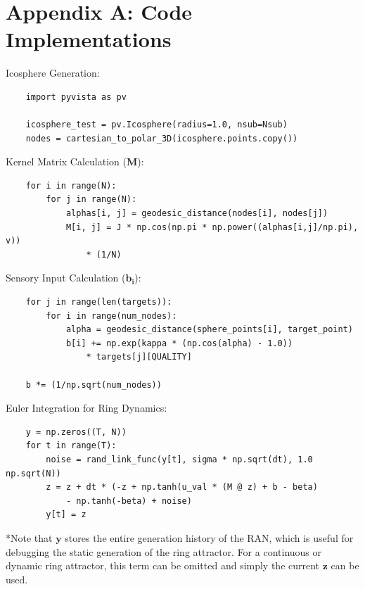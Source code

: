 \documentclass[12pt, letterpaper]{article}
\begin{document}
\section{Appendix A: Code Implementations}
\label{AppendixA}
Icosphere Generation: 
\begin{verbatim}
    import pyvista as pv
    
    icosphere_test = pv.Icosphere(radius=1.0, nsub=Nsub)
    nodes = cartesian_to_polar_3D(icosphere.points.copy())
\end{verbatim}

Kernel Matrix Calculation ($\mathbf{M}$): 
\begin{verbatim}
    for i in range(N):
        for j in range(N):           
            alphas[i, j] = geodesic_distance(nodes[i], nodes[j])
            M[i, j] = J * np.cos(np.pi * np.power((alphas[i,j]/np.pi), v)) 
                * (1/N)
\end{verbatim}


Sensory Input Calculation ($\mathbf{b_i}$):
\begin{verbatim}
    for j in range(len(targets)):
        for i in range(num_nodes):
            alpha = geodesic_distance(sphere_points[i], target_point)
            b[i] += np.exp(kappa * (np.cos(alpha) - 1.0)) 
                * targets[j][QUALITY]
    
    b *= (1/np.sqrt(num_nodes)) 
\end{verbatim}

Euler Integration for Ring Dynamics:
\begin{verbatim}
    y = np.zeros((T, N))
    for t in range(T):
        noise = rand_link_func(y[t], sigma * np.sqrt(dt), 1.0 np.sqrt(N))
        z = z + dt * (-z + np.tanh(u_val * (M @ z) + b - beta) 
            - np.tanh(-beta) + noise) 
        y[t] = z
\end{verbatim} 
*Note that $\mathbf{y}$ stores the entire generation history of the RAN, which is useful for debugging the static generation of the ring attractor. For a continuous or dynamic ring attractor, this term can be omitted and simply the current $\mathbf{z}$ can be used.

\printbibliography 
\end{document}
